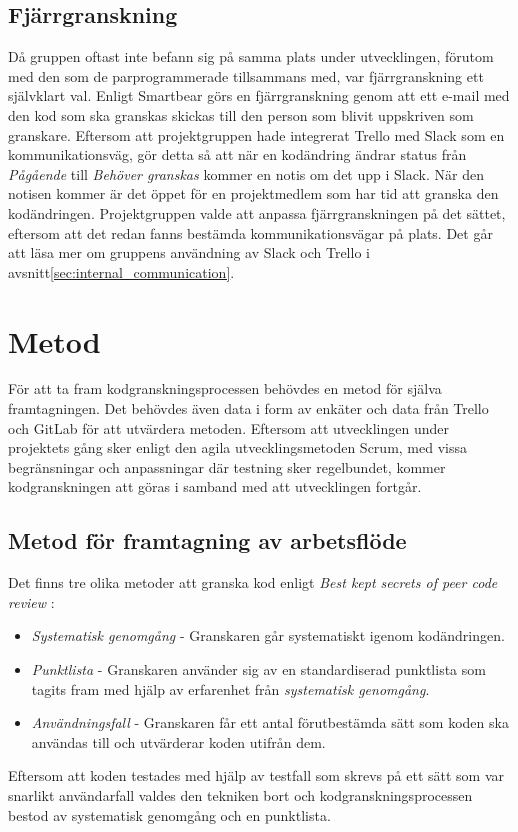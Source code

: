 \subsection{Fjärrgranskning}
Då gruppen oftast inte befann sig på samma plats under utvecklingen, förutom med den som de parprogrammerade tillsammans med, var fjärrgranskning ett självklart val. Enligt Smartbear görs en fjärrgranskning genom att ett e-mail med den kod som ska granskas skickas till den person som blivit uppskriven som granskare.\cite{website:smartbear} Eftersom att projektgruppen hade integrerat Trello med Slack som en kommunikationsväg, gör detta så att när en kodändring ändrar status från \textit{Pågående} till \textit{Behöver granskas} kommer en notis om det upp i Slack.\cite{website:slack}\cite{website:trello} När den notisen kommer är det öppet för en projektmedlem som har tid att granska den kodändringen. Projektgruppen valde att anpassa fjärrgranskningen på det sättet, eftersom att det redan fanns bestämda kommunikationsvägar på plats. Det går att läsa mer om gruppens användning av Slack och Trello i avsnitt\ref{sec:internal_communication}.

\section{Metod}
\label{cha:victor-method}
För att ta fram kodgranskningsprocessen behövdes en metod för själva framtagningen. Det behövdes även data i form av enkäter och data från Trello och GitLab för att utvärdera metoden. Eftersom att utvecklingen under projektets gång sker enligt den agila utvecklingsmetoden Scrum, med vissa begränsningar och anpassningar där testning sker regelbundet, kommer kodgranskningen att göras i samband med att utvecklingen fortgår.
\subsection{Metod för framtagning av arbetsflöde}
Det finns tre olika metoder att granska kod enligt \textit{Best kept secrets of peer code review}\cite{website:smartbear} :
\begin{itemize}
\item \textit{Systematisk genomgång} - Granskaren går systematiskt igenom kodändringen.
\item \textit{Punktlista} - Granskaren använder sig av en standardiserad punktlista som tagits fram med hjälp av erfarenhet från \textit{systematisk genomgång}.
\item \textit{Användningsfall} - Granskaren får ett antal förutbestämda sätt som koden ska användas till och utvärderar koden utifrån dem.
\end{itemize}
Eftersom att koden testades med hjälp av testfall som skrevs på ett sätt som var snarlikt användarfall valdes den tekniken bort och kodgranskningsprocessen bestod av systematisk genomgång och en punktlista. 
